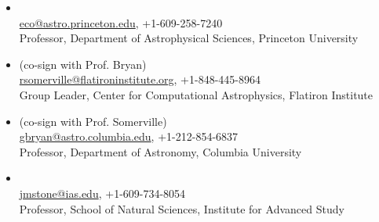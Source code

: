 \documentclass[12pt,preprint,letter]{aastex63_mod}
\begin{document}
\begin{itemize}%
\item \subtitle{Eve C. Ostriker} \\
\url{eco@astro.princeton.edu}, +1-609-258-7240\\
Professor, Department of Astrophysical Sciences, Princeton University

\item \subtitle{Rachel S. Somerville} (co-sign with Prof. Bryan)\\
\url{rsomerville@flatironinstitute.org}, +1-848-445-8964\\
Group Leader, Center for Computational Astrophysics, Flatiron Institute

\item \subtitle{Greg L. Bryan} (co-sign with Prof. Somerville) \\
\url{gbryan@astro.columbia.edu}, +1-212-854-6837\\
Professor, Department of Astronomy, Columbia University

\item \subtitle{James M. Stone} \\
\url{jmstone@ias.edu}, +1-609-734-8054\\
Professor, School of Natural Sciences, Institute for Advanced Study




\end{itemize}
\end{document}
